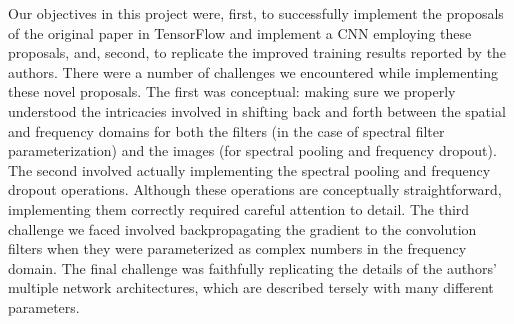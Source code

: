 \documentclass[10pt,journal,compsoc]{IEEEtran}
\begin{document}
Our objectives in this project were, first, to successfully implement the proposals of the original paper in TensorFlow and implement a CNN employing these proposals, and, second, to replicate the improved training results reported by the authors. There were a number of challenges we encountered while implementing these novel proposals. The first was conceptual: making sure we properly understood the intricacies involved in shifting back and forth between the spatial and frequency domains for both the filters (in the case of spectral filter parameterization) and the images (for spectral pooling and frequency dropout). The second involved actually implementing the spectral pooling and frequency dropout operations. Although these operations are conceptually straightforward, implementing them correctly required careful attention to detail. The third challenge we faced involved backpropagating the gradient to the convolution filters when they were parameterized as complex numbers in the frequency domain. The final challenge was faithfully replicating the details of the authors' multiple network architectures, which are described tersely with many different parameters.

%
%

\end{document}
